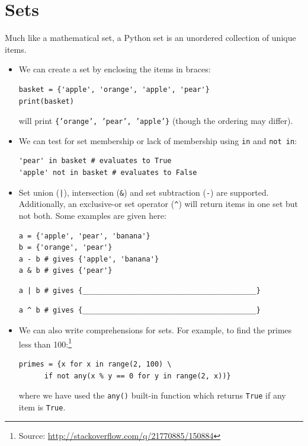 \documentclass[a4paper,twoside,titlepage]{memoir}
\newcommand{\shellcmd}{\texttt}
\begin{document}
\section{Sets}
\label{sec:sets}

Much like a mathematical set, a Python set is an unordered collection of unique items.
\begin{itemize}
\item We can create a set by enclosing the items in braces:
\begin{verbatim}
basket = {'apple', 'orange', 'apple', 'pear'}
print(basket)
\end{verbatim}
will print \shellcmd{\{'orange', 'pear', 'apple'\}} (though the ordering may differ).
\item We can test for set membership or lack of membership using \shellcmd{in} and \shellcmd{not in}:
\begin{verbatim}
'pear' in basket # evaluates to True
'apple' not in basket # evaluates to False
\end{verbatim}

\item Set union (\shellcmd{|}), intersection (\shellcmd{\&}) and set subtraction (\shellcmd{-}) are supported.  Additionally, an exclusive-or set operator (\shellcmd{\^}) will return items in one set but not both.  Some examples are given here:
\begin{verbatim}
a = {'apple', 'pear', 'banana'}
b = {'orange', 'pear'}
a - b # gives {'apple', 'banana'}
a & b # gives {'pear'}
\end{verbatim}
\begin{verbatim}
a | b # gives {_________________________________________}
\end{verbatim}
\begin{verbatim}
a ^ b # gives {_________________________________________}
\end{verbatim}

\item We can also write comprehensions for sets.  For example, to find the primes less than 100:\footnote{Source: \url{http://stackoverflow.com/q/21770885/150884}}
\begin{verbatim}
primes = {x for x in range(2, 100) \
	  if not any(x % y == 0 for y in range(2, x))}
\end{verbatim}
where we have used the \shellcmd{any()} built-in function which returns \shellcmd{True} if any item is \shellcmd{True}.
\end{itemize}
\end{document}
